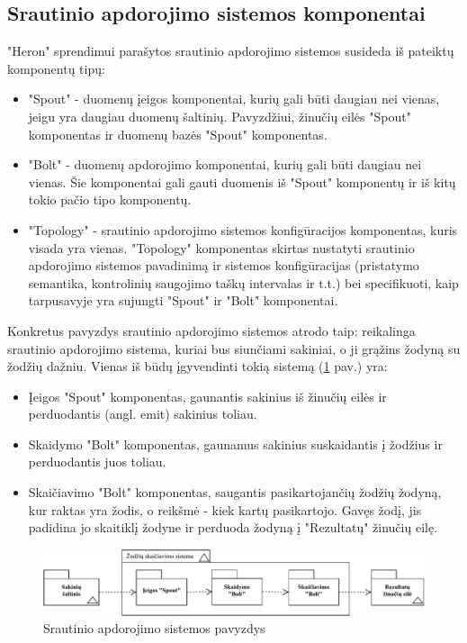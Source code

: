 \documentclass{VUMIFPSbakalaurinis}
\begin{document}
\subsection{Srautinio apdorojimo sistemos komponentai}
"Heron" sprendimui parašytos srautinio apdorojimo sistemos susideda iš pateiktų komponentų tipų:
\begin{itemize}
    \item "Spout" - duomenų įeigos komponentai, kurių gali būti daugiau nei vienas, jeigu yra daugiau duomenų šaltinių. Pavyzdžiui, žinučių eilės "Spout" komponentas ir duomenų bazės "Spout" komponentas.
    \item "Bolt" - duomenų apdorojimo komponentai, kurių gali būti daugiau nei vienas. Šie komponentai gali gauti duomenis iš "Spout" komponentų ir iš kitų tokio pačio tipo komponentų.
    \item "Topology" - srautinio apdorojimo sistemos konfigūracijos komponentas, kuris visada yra vienas. "Topology" komponentas skirtas nustatyti srautinio apdorojimo sistemos pavadinimą ir sistemos konfigūracijas (pristatymo semantika, kontrolinių saugojimo taškų intervalas ir t.t.) bei specifikuoti, kaip tarpusavyje yra sujungti "Spout" ir "Bolt" komponentai. 
\end{itemize}\par
Konkretus pavyzdys srautinio apdorojimo sistemos atrodo taip:
reikalinga srautinio apdorojimo sistema, kuriai bus siunčiami sakiniai, o ji grąžins žodyną su žodžių dažniu. Vienas iš būdų įgyvendinti tokią sistemą (\ref{img:system-example} pav.) yra:
\begin{itemize}
    \item Įeigos "Spout" komponentas, gaunantis sakinius iš žinučių eilės ir perduodantis (angl. emit) sakinius toliau.
    \item Skaidymo "Bolt" komponentas, gaunamus sakinius suskaidantis į žodžius ir perduodantis juos toliau.
    \item Skaičiavimo "Bolt" komponentas, saugantis pasikartojančių žodžių žodyną, kur raktas yra žodis, o reikšmė - kiek kartų pasikartojo. Gavęs žodį, jis padidina jo skaitiklį žodyne ir perduoda žodyną į "Rezultatų" žinučių eilę.
\end{itemize}
\begin{figure}[H]
    \centering
    \includegraphics[width=1\textwidth]{img/pavyzdine_sistema.pdf}
    \caption{Srautinio apdorojimo sistemos pavyzdys}
    \label{img:system-example}
\end{figure}
\end{document}

